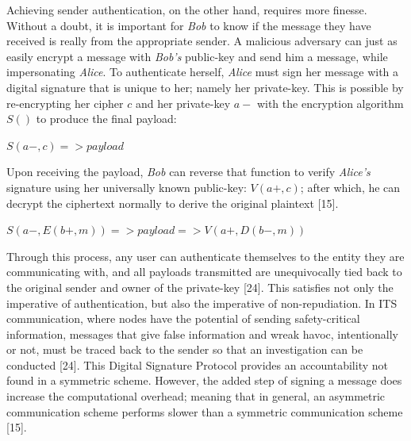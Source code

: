 \documentclass[conference,compsoc]{IEEEtran}
\begin{document}
Achieving sender authentication, on the other hand, requires more finesse. Without a doubt, it is important for \emph{Bob} to know if the message they have received is really from the appropriate sender. A malicious adversary can just as easily encrypt a message with \emph{Bob’s} public-key and send him a message, while impersonating \emph{Alice}. To authenticate herself, \emph{Alice} must sign her message with a digital signature that is  unique to her; namely her private-key. This is possible by re-encrypting her cipher $c$ and her private-key $a-$ with the encryption algorithm $S()$ to produce the final payload:\\

\begin{center}
\large $S(a-, c) => payload$ 
\break
\end{center}

Upon receiving the payload, \emph{Bob} can reverse that function to verify \emph{Alice’s} signature using her universally known public-key: $V(a+, c)$; after which, he can decrypt the ciphertext normally to derive the original plaintext [15].\\

\begin{center}
\large $S(a-, E(b+, m)) => payload = > V(a+, D(b-, m))$ 
\break
\end{center}

Through this process, any user can authenticate themselves to the entity they are communicating with, and all payloads transmitted are unequivocally tied back to the original sender and owner of the private-key [24]. This satisfies not only the imperative of authentication, but also the imperative of non-repudiation. In ITS communication, where nodes have the potential of sending safety-critical information, messages that give false information and wreak havoc, intentionally or not, must be traced back to the sender so that an investigation can be conducted [24]. This Digital Signature Protocol provides an accountability not found in a symmetric scheme. However, the added step of signing a message does increase the computational overhead; meaning that in general, an asymmetric communication scheme performs slower than a symmetric communication scheme [15].
\end{document}

